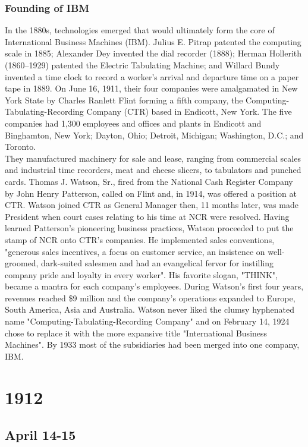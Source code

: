 \documentclass[11pt]{report}
\begin{document}
\subsection{Founding of IBM}
In the 1880s, technologies emerged that would ultimately form the core of International Business Machines (IBM). Julius E. Pitrap patented the computing scale in 1885; Alexander Dey invented the dial recorder (1888); Herman Hollerith (1860–1929) patented the Electric Tabulating Machine; and Willard Bundy invented a time clock to record a worker's arrival and departure time on a paper tape in 1889. On June 16, 1911, their four companies were amalgamated in New York State by Charles Ranlett Flint forming a fifth company, the Computing-Tabulating-Recording Company (CTR) based in Endicott, New York. The five companies had 1,300 employees and offices and plants in Endicott and Binghamton, New York; Dayton, Ohio; Detroit, Michigan; Washington, D.C.; and Toronto.\\ \indent They manufactured machinery for sale and lease, ranging from commercial scales and industrial time recorders, meat and cheese slicers, to tabulators and punched cards. Thomas J. Watson, Sr., fired from the National Cash Register Company by John Henry Patterson, called on Flint and, in 1914, was offered a position at CTR. Watson joined CTR as General Manager then, 11 months later, was made President when court cases relating to his time at NCR were resolved. Having learned Patterson's pioneering business practices, Watson proceeded to put the stamp of NCR onto CTR's companies. He implemented sales conventions, "generous sales incentives, a focus on customer service, an insistence on well-groomed, dark-suited salesmen and had an evangelical fervor for instilling company pride and loyalty in every worker". His favorite slogan, "THINK", became a mantra for each company's employees. During Watson's first four years, revenues reached \$9 million and the company's operations expanded to Europe, South America, Asia and Australia. Watson never liked the clumsy hyphenated name "Computing-Tabulating-Recording Company" and on February 14, 1924 chose to replace it with the more expansive title "International Business Machines". By 1933 most of the subsidiaries had been merged into one company, IBM.

\chapter{1912}
\section{April 14-15}
\end{document}
